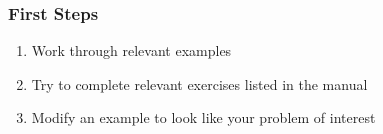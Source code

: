 \documentclass[aspectratio=169]{beamer}
\begin{document}
\begin{frame}[fragile]
  \frametitle{First Steps}
  \summary{}

  \begin{enumerate}
    \begin{bashcode}
      cd PATH_TO_PYLITH_DIR
      mkdir playpen
      cp -r src/pylith-4.1.0/examples playpen/
    \end{bashcode}
  \item Work through relevant examples
  \item Try to complete relevant exercises listed in the manual
  \item Modify an example to look like your problem of interest
  \end{enumerate}

\end{frame}

 
\end{document}
